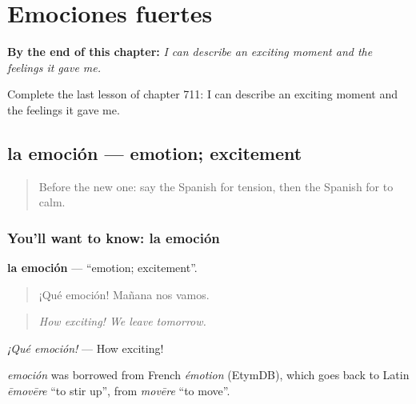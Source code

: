 
\chapter{Emociones fuertes}
\label{ch:es-emociones-fuertes}

\begin{chapteropening}
\textbf{By the end of this chapter:} \emph{I can describe an exciting moment and the feelings it gave me.}

Complete the last lesson of chapter 711: I can describe an exciting moment and the feelings it gave me.
\end{chapteropening}

\section[la emoción]{la emoción — emotion; excitement}

\label{lesson:ES-C711-emocion}



\begin{quote}
Before the new one: say the Spanish for tension, then the Spanish for to calm.
\end{quote}

\subsection*{You'll want to know: la emoción}
\textbf{la emoción} — \textquotedblleft{}emotion; excitement\textquotedblright{}.

\begin{quote}
¡Qué emoción! Mañana nos vamos.
\end{quote}

\begin{quote}
\emph{How exciting! We leave tomorrow.}
\end{quote}

\emph{¡Qué emoción!} — How exciting!

\begin{cousinweb}
\emph{emoción} was borrowed from French \emph{émotion} (EtymDB), which goes back to Latin \emph{ēmovēre} \textquotedblleft{}to stir up\textquotedblright{}, from \emph{movēre} \textquotedblleft{}to move\textquotedblright{}.
\end{cousinweb}

